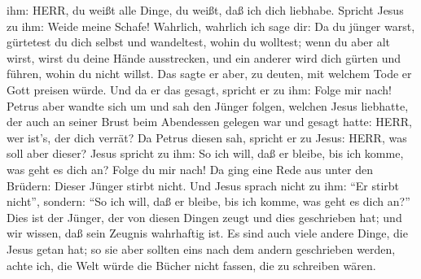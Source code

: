 ihm: HERR, du weißt alle Dinge, du weißt, daß ich dich liebhabe. Spricht
Jesus zu ihm: Weide meine Schafe!  Wahrlich, wahrlich ich
sage dir: Da du jünger warst, gürtetest du dich selbst und wandeltest,
wohin du wolltest; wenn du aber alt wirst, wirst du deine Hände
ausstrecken, und ein anderer wird dich gürten und führen, wohin du nicht
willst.  Das sagte er aber, zu deuten, mit welchem Tode er
Gott preisen würde. Und da er das gesagt, spricht er zu ihm: Folge mir
nach!  Petrus aber wandte sich um und sah den Jünger
folgen, welchen Jesus liebhatte, der auch an seiner Brust beim
Abendessen gelegen war und gesagt hatte: HERR, wer ist's, der dich
verrät?  Da Petrus diesen sah, spricht er zu Jesus: HERR,
was soll aber dieser?  Jesus spricht zu ihm: So ich will,
daß er bleibe, bis ich komme, was geht es dich an? Folge du mir nach!
 Da ging eine Rede aus unter den Brüdern: Dieser Jünger
stirbt nicht. Und Jesus sprach nicht zu ihm: ``Er stirbt nicht'',
sondern: ``So ich will, daß er bleibe, bis ich komme, was geht es dich
an?''  Dies ist der Jünger, der von diesen Dingen zeugt und
dies geschrieben hat; und wir wissen, daß sein Zeugnis wahrhaftig ist.
 Es sind auch viele andere Dinge, die Jesus getan hat; so
sie aber sollten eins nach dem andern geschrieben werden, achte ich, die
Welt würde die Bücher nicht fassen, die zu schreiben wären.
